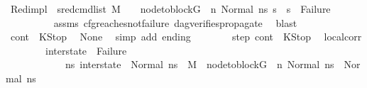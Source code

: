 \begin{isabellebody}
\ Red{\isacharunderscore}{\kern0pt}impl{\isacharcolon}{\kern0pt}\ {\isachardoublequoteopen}{\isacharparenleft}{\kern0pt}{\isasymAnd}\ s{}{\isacharprime}{\kern0pt}{\isachardot}{\kern0pt}{\isacharparenleft}{\kern0pt}{\isacharparenleft}{\kern0pt}red{\isacharunderscore}{\kern0pt}cmd{\isacharunderscore}{\kern0pt}list\ M\ {\isasymLambda}\ {\isasymGamma}\ {\isasymOmega}\ {\isacharparenleft}{\kern0pt}node{\isacharunderscore}{\kern0pt}to{\isacharunderscore}{\kern0pt}block{\isacharparenleft}{\kern0pt}G{\isacharparenright}{\kern0pt}\ {\isacharbang}{\kern0pt}\ n{\isacharparenright}{\kern0pt}\ {\isacharparenleft}{\kern0pt}Normal\ ns{}{\isacharparenright}{\kern0pt}\ s{}{\isacharprime}{\kern0pt}{\isacharparenright}{\kern0pt}\ {\isasymLongrightarrow}\ {\isacharparenleft}{\kern0pt}s{}{\isacharprime}{\kern0pt}\ {\isasymnoteq}\ Failure{\isacharparenright}{\kern0pt}{\isacharparenright}{\kern0pt}{\isacharparenright}{\kern0pt}{\isachardoublequoteclose}\isanewline
\ \ \ \ \ \ \ \ \isamarkupfalse%
\ assms{\isacharparenleft}{\kern0pt}{}{\isacharparenright}{\kern0pt}\ cfg{\isacharunderscore}{\kern0pt}reaches{\isacharunderscore}{\kern0pt}not{\isacharunderscore}{\kern0pt}failure\ dag{\isacharunderscore}{\kern0pt}verifies{\isacharunderscore}{\kern0pt}propagate{\isacharunderscore}{\kern0pt}{}\ \isamarkupfalse%
\ blast\isanewline
\isanewline
\ \ \ \ \ \ \isamarkupfalse%
\ {\isachardoublequoteopen}cont{}\ {\isacharequal}{\kern0pt}\ KStop{\isachardoublequoteclose}\ \isamarkupfalse%
\ None\ \isamarkupfalse%
\ {\isacharparenleft}{\kern0pt}simp\ add{\isacharcolon}{\kern0pt}\ ending{\isacharparenright}{\kern0pt}\isanewline
\isanewline
\ \ \ \ \ \ \isamarkupfalse%
\ step\ {\isacartoucheopen}cont{}\ {\isacharequal}{\kern0pt}\ KStop{\isacartoucheclose}\ \isamarkupfalse%
\ local{\isacharunderscore}{\kern0pt}corr{\isacharcolon}{\kern0pt}\isanewline
\ \ \ \ \ \ \ \ {\isachardoublequoteopen}inter{\isacharunderscore}{\kern0pt}state\ {\isasymnoteq}\ Failure\ \ {\isasymand}\isanewline
\ \ \ \ \ \ \ \ \ \ \ \ {\isacharparenleft}{\kern0pt}{\isasymforall}ns{}{\isacharprime}{\kern0pt}{\isachardot}{\kern0pt}\ inter{\isacharunderscore}{\kern0pt}state\ {\isacharequal}{\kern0pt}\ Normal\ ns{}{\isacharprime}{\kern0pt}\ {\isasymlongrightarrow}\ {\isacharparenleft}{\kern0pt}M{\isacharcomma}{\kern0pt}{\isasymLambda}{\isacharcomma}{\kern0pt}{\isasymGamma}{\isacharcomma}{\kern0pt}{\isasymOmega}\ {\isasymturnstile}\ {\isasymlangle}node{\isacharunderscore}{\kern0pt}to{\isacharunderscore}{\kern0pt}block{\isacharparenleft}{\kern0pt}G{\isacharparenright}{\kern0pt}\ {\isacharbang}{\kern0pt}\ n{\isacharcomma}{\kern0pt}\ Normal\ ns{}{\isasymrangle}\ {\isacharbrackleft}{\kern0pt}{\isasymrightarrow}{\isacharbrackright}{\kern0pt}\ Normal\ ns{}{\isacharprime}{\kern0pt}{\isacharparenright}{\kern0pt}{\isacharparenright}{\kern0pt}{\isachardoublequoteclose}\isanewline

\end{isabellebody}
